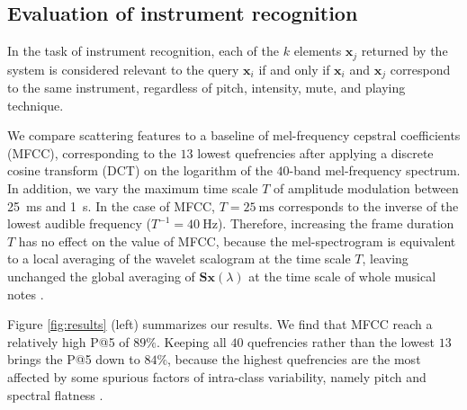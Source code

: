 


\subsection{Evaluation of instrument recognition}

In the task of instrument recognition, each of the $k$ elements $\boldsymbol{x}_j$ returned by the system is considered relevant to the query $\boldsymbol{x}_i$ if and only if $\boldsymbol{x}_i$ and $\boldsymbol{x}_j$ correspond to the same instrument, regardless of pitch, intensity, mute, and playing technique.

We compare scattering features to a baseline of mel-frequency cepstral coefficients (MFCC), corresponding to the $13$ lowest quefrencies after applying a discrete cosine transform (DCT) on the logarithm of the $40$-band mel-frequency spectrum.
In addition, we vary the maximum time scale $T$ of amplitude modulation between \SI{25}{\milli\second} and  \SI{1}{\second}.
In the case of MFCC, $T=\SI{25}{\milli\second}$ corresponds to the inverse of the lowest audible frequency ($T^{-1}=\SI{40}{\Hz}$).
Therefore, increasing the frame duration $T$ has no effect on the value of MFCC, because the mel-spectrogram is equivalent to a local averaging of the wavelet scalogram at the time scale $T$, leaving unchanged the global averaging of $\mathbf{S}\boldsymbol{x}(\lambda)$ at the time scale of whole musical notes \cite[section II.B]{anden2012dafx}.

Figure \ref{fig:results} (left) summarizes our results.
We find that MFCC reach a relatively high P@5 of $89\%$.
Keeping all $40$ quefrencies rather than the lowest $13$ brings the P@5 down to $84\%$, because the highest quefrencies are the most affected by some spurious factors of intra-class variability, namely pitch and spectral flatness \cite[subsection 2.3.3]{lostanlen2017phd}.

